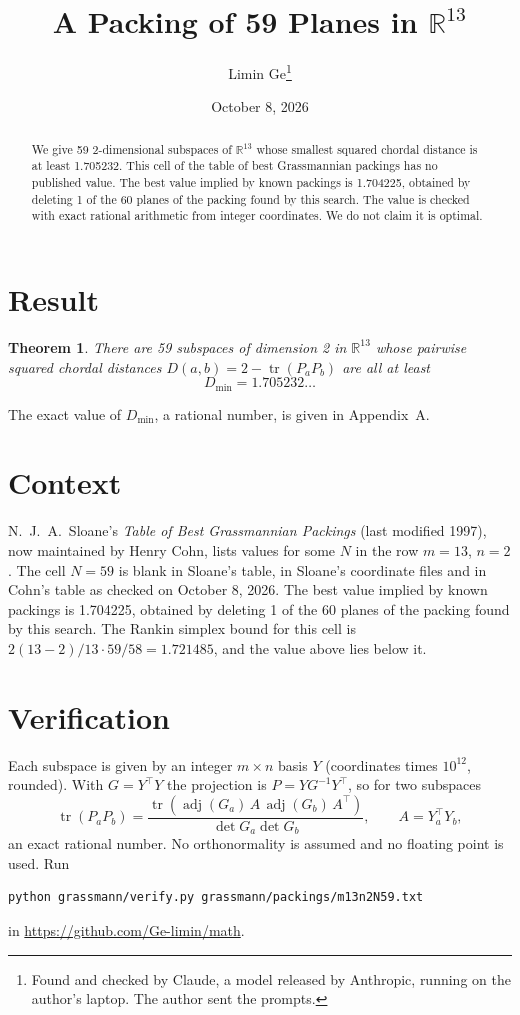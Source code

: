 \documentclass[11pt,a4paper]{article}
\title{A Packing of 59 Planes in $\mathbb{R}^{13}$}
\author{Limin Ge\thanks{Found and checked by Claude, a model released by Anthropic, running on the author's laptop. The author sent the prompts.}}
\date{October 8, 2026}
\newtheorem*{theorem}{Theorem}
\begin{document}
\maketitle
\begin{abstract}
We give 59 2-dimensional subspaces of $\mathbb{R}^{13}$ whose smallest squared chordal distance is at least 1.705232. This cell of the table of best Grassmannian packings has no published value. The best value implied by known packings is 1.704225, obtained by deleting 1 of the 60 planes of the packing found by this search. The value is checked with exact rational arithmetic from integer coordinates. We do not claim it is optimal.
\end{abstract}

\section{Result}
\begin{theorem}
There are 59 subspaces of dimension 2 in $\mathbb{R}^{13}$ whose pairwise squared chordal distances $D(a,b) = 2 - \operatorname{tr}(P_aP_b)$ are all at least
\[ D_{\min} = 1.705232\ldots \]
\end{theorem}
The exact value of $D_{\min}$, a rational number, is given in Appendix~A.


\section{Context}
N.~J.~A.~Sloane's \emph{Table of Best Grassmannian Packings} (last modified 1997), now maintained by Henry Cohn, lists values for some $N$ in the row $m=13$, $n=2$. The cell $N=59$ is blank in Sloane's table, in Sloane's coordinate files and in Cohn's table as checked on October 8, 2026. The best value implied by known packings is 1.704225, obtained by deleting 1 of the 60 planes of the packing found by this search. The Rankin simplex bound for this cell is $2(13-2)/13\cdot 59/58 = 1.721485$, and the value above lies below it.


\section{Verification}
Each subspace is given by an integer $m\times n$ basis $Y$ (coordinates times $10^{12}$, rounded). With $G=Y^\top Y$ the projection is $P=YG^{-1}Y^\top$, so for two subspaces
\[ \operatorname{tr}(P_aP_b)=\frac{\operatorname{tr}(\operatorname{adj}(G_a)\,A\,\operatorname{adj}(G_b)\,A^\top)}{\det G_a\det G_b},\qquad A=Y_a^\top Y_b, \]
an exact rational number. No orthonormality is assumed and no floating point is used. Run
\begin{verbatim}
python grassmann/verify.py grassmann/packings/m13n2N59.txt
\end{verbatim}
in \url{https://github.com/Ge-limin/math}.
\end{document}
